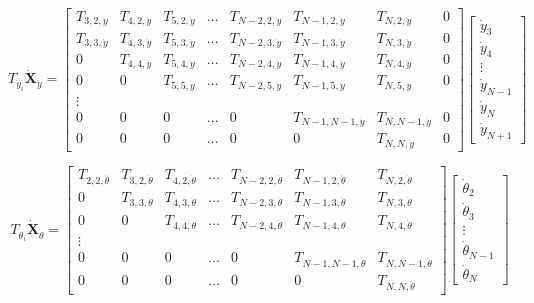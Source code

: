 \documentclass[12pt,letterpaper,titlepage]{article}
\begin{document}
\[
T_{\dot{y}_i}\mathbf{\dot{X}}_{\dot{y}} = \begin{bmatrix}
T_{3,2,\dot{y}}&T_{4,2,\dot{y}}&T_{5,2,\dot{y}}&\hdots&T_{N-2,2,\dot{y}}&T_{N-1,2,\dot{y}}&T_{N,2,\dot{y}}&0\\
T_{3,3,\dot{y}}&T_{4,3,\dot{y}}&T_{5,3,\dot{y}}&\hdots&T_{N-2,3,\dot{y}}&T_{N-1,3,\dot{y}}&T_{N,3,\dot{y}}&0\\
0&T_{4,4,\dot{y}}&T_{5,4,\dot{y}}&\hdots&T_{N-2,4,\dot{y}}&T_{N-1,4,\dot{y}}&T_{N,4,\dot{y}}&0\\
0&0&T_{5,5,\dot{y}}&\hdots&T_{N-2,5,\dot{y}}&T_{N-1,5,\dot{y}}&T_{N,5,\dot{y}}&0\\
\vdots\\
0&0&0&\hdots&0&T_{N-1,N-1,\dot{y}}&T_{N,N-1,\dot{y}}&0\\
0&0&0&\hdots&0&0&T_{N,N,\dot{y}}&0
\end{bmatrix}
\begin{bmatrix}
\dot{y}_3\\
\dot{y}_4\\
\vdots\\
\dot{y}_{N-1}\\
\dot{y}_{N}\\
\dot{y}_{N+1}
\end{bmatrix}
\]

\[
T_{\dot{\theta}_i}\mathbf{\dot{X}}_{\dot{\theta}} = \begin{bmatrix}
T_{2,2,\dot{\theta}}&T_{3,2,\dot{\theta}}&T_{4,2,\dot{\theta}}&\hdots&T_{N-2,2,\dot{\theta}}&T_{N-1,2,\dot{\theta}}&T_{N,2,\dot{\theta}}\\
0&T_{3,3,\dot{\theta}}&T_{4,3,\dot{\theta}}&\hdots&T_{N-2,3,\dot{\theta}}&T_{N-1,3,\dot{\theta}}&T_{N,3,\dot{\theta}}\\
0&0&T_{4,4,\dot{\theta}}&\hdots&T_{N-2,4,\dot{\theta}}&T_{N-1,4,\dot{\theta}}&T_{N,4,\dot{\theta}}\\
\vdots\\
0&0&0&\hdots&0&T_{N-1,N-1,\dot{\theta}}&T_{N,N-1,\dot{\theta}}\\
0&0&0&\hdots&0&0&T_{N,N,\dot{\theta}}
\end{bmatrix}
\begin{bmatrix}
\dot{\theta}_2\\
\dot{\theta}_3\\
\vdots\\
\dot{\theta}_{N-1}\\
\dot{\theta}_{N}
\end{bmatrix}
\]

\newpage
\end{document}
